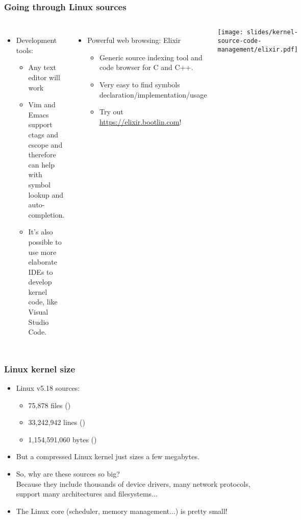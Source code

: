 \begin{frame}
  \frametitle{Going through Linux sources}
  \begin{columns}
    \begin{itemize}
    \item Development tools:
      \begin{itemize}
      \item Any text editor will work
      \item Vim and Emacs support ctags and cscope and therefore can help
        with symbol lookup and auto-completion.
      \item It's also possible to use more elaborate IDEs to develop
        kernel code, like Visual Studio Code.
      \end{itemize}
    \end{itemize}
    \begin{itemize}
    \item Powerful web browsing: Elixir
      \begin{itemize}
      \item Generic source indexing tool and code browser for C and C++.
      \item Very easy to find symbols declaration/implementation/usage
      \item Try out \url{https://elixir.bootlin.com}!
      \end{itemize}
    \end{itemize}
    \begin{center}
      \texttt{[image: slides/kernel-source-code-management/elixir.pdf]}
    \end{center}
  \end{columns}
\end{frame}

\begin{frame}
  \frametitle{Linux kernel size}
  \begin{itemize}
  \item Linux v5.18 sources:\\
    \begin{itemize}
	\item 75,878 files ()
	\item 33,242,942 lines ()
	\item 1,154,591,060 bytes ()
    \end{itemize}
  \item But a compressed Linux kernel just sizes a few megabytes.
  \item So, why are these sources so big?\\
    Because they include thousands of device drivers, many network
    protocols, support many architectures and filesystems...
  \item The Linux core (scheduler, memory management...) is pretty
    small!
  \end{itemize}
\end{frame}

